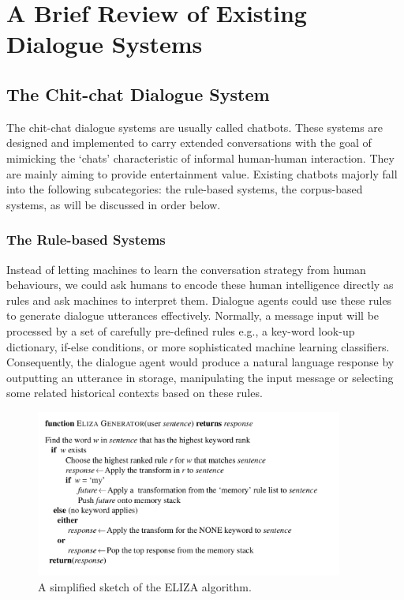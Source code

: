 \documentclass[bsc,frontabs,twoside,singlespacing,parskip,deptreport]{infthesis}     %
\begin{document}
\section {A Brief Review of Existing Dialogue Systems}

\subsection{The Chit-chat Dialogue System}

The chit-chat dialogue systems are usually called chatbots. These systems are designed and implemented to carry extended conversations with the goal of mimicking the ‘chats’ characteristic of informal human-human interaction\cite{jurafsky2019speech}. They are mainly aiming to provide entertainment value. Existing chatbots majorly fall into the following subcategories: the rule-based systems, the corpus-based systems, as will be discussed in order below.

\subsubsection*{The Rule-based Systems}

Instead of letting machines to learn the conversation strategy from human behaviours, we could ask humans to encode these human intelligence directly as rules and ask machines to interpret them. Dialogue agents could use these rules to generate dialogue utterances effectively. Normally, a message input will be processed by a set of carefully pre-defined rules e.g., a key-word look-up dictionary, if-else conditions, or more sophisticated machine learning classifiers\cite{jiweilithesis}. Consequently, the dialogue agent would produce a natural language response by outputting an utterance in storage, manipulating the input message or selecting some related historical contexts based on these rules.

\begin{figure}[h]
    \centering
    \includegraphics[width=0.9\textwidth]{elizarule.jpeg}
    \caption{A simplified sketch of the ELIZA algorithm.}
    \label{fig:elizarule}
\end{figure}
\end{document}
